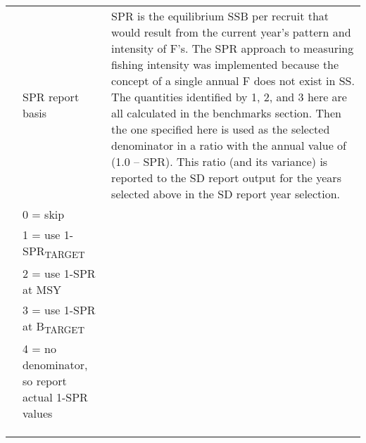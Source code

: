 \begin{landscape}
\begin{longtable}{p{3cm} p{7cm} p{11cm}}
 \pagebreak
 1 & SPR report basis & \multirow{1}{1cm}[-0.1cm]{\parbox{11cm}{SPR is the equilibrium SSB per recruit that would result from the current year’s pattern and intensity of F’s.  The SPR approach to measuring fishing intensity was implemented because the concept of a single annual F does not exist in SS.
		The quantities identified by 1, 2, and 3 here are all calculated in the benchmarks section.  Then the one specified here is used as the selected denominator in a ratio with the annual value of (1.0 – SPR). This ratio (and its variance) is reported to the SD report output for the years selected above in the SD report year selection.}}\\
  & 0 = skip & \\
  & 1 = use 1-SPR\textsubscript{TARGET} & \\
  & 2 = use 1-SPR at MSY & \\
  & 3 = use 1-SPR at B\textsubscript{TARGET} & \\
  & 4 = no denominator, so report actual 1-SPR values & \\
  & & \\
  & & \\
  & & \\
  

\end{longtable}
\end{landscape}
